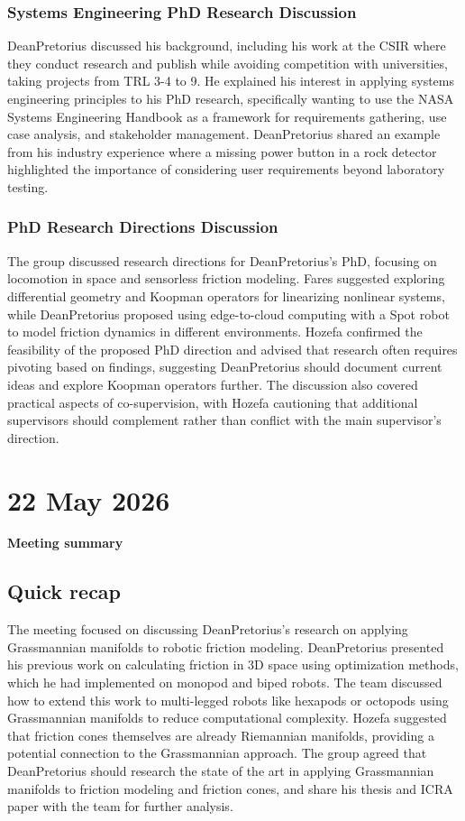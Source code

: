 \subsubsection{Systems Engineering PhD Research Discussion}

DeanPretorius discussed his background, including his work at the CSIR where they conduct research and publish while avoiding competition with universities, taking projects from TRL 3-4 to 9. He explained his interest in applying systems engineering principles to his PhD research, specifically wanting to use the NASA Systems Engineering Handbook as a framework for requirements gathering, use case analysis, and stakeholder management. DeanPretorius shared an example from his industry experience where a missing power button in a rock detector highlighted the importance of considering user requirements beyond laboratory testing.

\subsubsection{PhD Research Directions Discussion}

The group discussed research directions for DeanPretorius's PhD, focusing on locomotion in space and sensorless friction modeling. Fares suggested exploring differential geometry and Koopman operators for linearizing nonlinear systems, while DeanPretorius proposed using edge-to-cloud computing with a Spot robot to model friction dynamics in different environments. Hozefa confirmed the feasibility of the proposed PhD direction and advised that research often requires pivoting based on findings, suggesting DeanPretorius should document current ideas and explore Koopman operators further. The discussion also covered practical aspects of co-supervision, with Hozefa cautioning that additional supervisors should complement rather than conflict with the main supervisor's direction.

\section{ 22 May 2026}

\textbf{Meeting summary }

\subsection{Quick recap}

The meeting focused on discussing DeanPretorius's research on applying Grassmannian manifolds to robotic friction modeling. DeanPretorius presented his previous work on calculating friction in 3D space using optimization methods, which he had implemented on monopod and biped robots. The team discussed how to extend this work to multi-legged robots like hexapods or octopods using Grassmannian manifolds to reduce computational complexity. Hozefa suggested that friction cones themselves are already Riemannian manifolds, providing a potential connection to the Grassmannian approach. The group agreed that DeanPretorius should research the state of the art in applying Grassmannian manifolds to friction modeling and friction cones, and share his thesis and ICRA paper with the team for further analysis.

